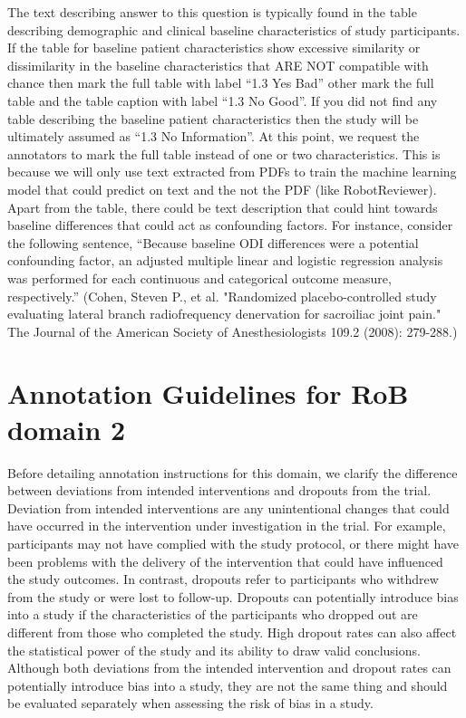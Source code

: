 \documentclass[sn-mathphys,Numbered]{sn-jnl}%
\begin{document}
The text describing answer to this question is typically found in the table describing demographic and clinical baseline characteristics of study participants.
If the table for baseline patient characteristics show excessive similarity or dissimilarity in the baseline characteristics that ARE NOT compatible with chance then mark the full table with label ``1.3 Yes Bad'' other mark the full table and the table caption with label ``1.3 No Good''.
If you did not find any table describing the baseline patient characteristics then the study will be ultimately assumed as ``1.3 No Information''.
At this point, we request the annotators to mark the full table instead of one or two characteristics.
This is because we will only use text extracted from PDFs to train the machine learning model that could predict on text and the not the PDF (like RobotReviewer).
Apart from the table, there could be text description that could hint towards baseline differences that could act as confounding factors.
For instance, consider the following sentence, ``Because baseline ODI differences were a potential confounding factor, an adjusted multiple linear and logistic regression analysis was performed for each continuous and categorical outcome measure, respectively.'' (Cohen, Steven P., et al. "Randomized placebo-controlled study evaluating lateral branch radiofrequency denervation for sacroiliac joint pain." The Journal of the American Society of Anesthesiologists 109.2 (2008): 279-288.)


%
%
%
\section*{Annotation Guidelines for RoB domain 2}
\label{sec:dom2}
%
Before detailing annotation instructions for this domain, we clarify the difference between deviations from intended interventions and dropouts from the trial.
Deviation from intended interventions are any unintentional changes that could have occurred in the intervention under investigation in the trial.
For example, participants may not have complied with the study protocol, or there might have been problems with the delivery of the intervention that could have influenced the study outcomes.
In contrast, dropouts refer to participants who withdrew from the study or were lost to follow-up.
Dropouts can potentially introduce bias into a study if the characteristics of the participants who dropped out are different from those who completed the study.
High dropout rates can also affect the statistical power of the study and its ability to draw valid conclusions.
Although both deviations from the intended intervention and dropout rates can potentially introduce bias into a study, they are not the same thing and should be evaluated separately when assessing the risk of bias in a study.
%
%
%
\end{document}
